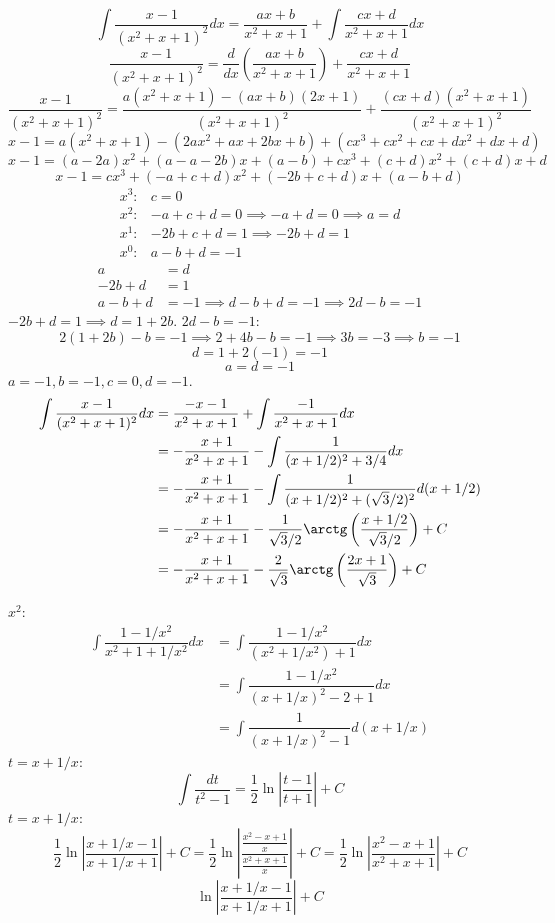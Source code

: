 \documentclass{report}
\begin{document}
\sol
{}
\[
\int \dfrac{x-1}{(x^2+x+1)^2} dx = \dfrac{ax+b}{x^2+x+1} + \int \dfrac{cx+d}{x^2+x+1} dx
\]
\[
\dfrac{x-1}{(x^2+x+1)^2} = \dfrac{d}{dx}\left( \dfrac{ax+b}{x^2+x+1} \right) + \dfrac{cx+d}{x^2+x+1}
\]
\[
\dfrac{x-1}{(x^2+x+1)^2} = \dfrac{a(x^2+x+1) - (ax+b)(2x+1)}{(x^2+x+1)^2} + \dfrac{(cx+d)(x^2+x+1)}{(x^2+x+1)^2}
\]
\[
x-1 = a(x^2+x+1) - (2ax^2+ax+2bx+b) + (cx^3+cx^2+cx+dx^2+dx+d)
\]
\[
x-1 = (a-2a)x^2+(a-a-2b)x+(a-b) + cx^3+(c+d)x^2+(c+d)x+d
\]
\[
x-1 = cx^3 + (-a+c+d)x^2 + (-2b+c+d)x + (a-b+d)
\]
\begin{align*}
x^3:& c = 0 \\
x^2:& -a+c+d = 0 \implies -a+d = 0 \implies a=d \\
x^1:& -2b+c+d = 1 \implies -2b+d = 1 \\
x^0:& a-b+d = -1
\end{align*}
\begin{align*}
a&=d \\
-2b+d&=1 \\
a-b+d&=-1 \implies d-b+d=-1 \implies 2d-b=-1
\end{align*}
 $-2b+d=1 \implies d = 1+2b$.  $2d-b=-1$:
\[
2(1+2b) - b = -1 \implies 2+4b-b = -1 \implies 3b = -3 \implies b = -1
\]
\[
d = 1+2(-1) = -1
\]
\[
a = d = -1
\]
 $a=-1, b=-1, c=0, d=-1$.
\begin{align*}
\int \dfrac{x-1}{(x^2+x+1)^2} dx &= \dfrac{-x-1}{x^2+x+1} + \int \dfrac{-1}{x^2+x+1} dx \\
&= -\dfrac{x+1}{x^2+x+1} - \int \dfrac{1}{(x+1/2)^2 + 3/4} dx \\
&= -\dfrac{x+1}{x^2+x+1} - \int \dfrac{1}{(x+1/2)^2 + (\sqrt{3}/2)^2} d(x+1/2) \\
&= -\dfrac{x+1}{x^2+x+1} - \dfrac{1}{\sqrt{3}/2} \arctg \left( \dfrac{x+1/2}{\sqrt{3}/2} \right) + C \\
&= -\dfrac{x+1}{x^2+x+1} - \dfrac{2}{\sqrt{3}} \arctg \left( \dfrac{2x+1}{\sqrt{3}} \right) + C
\end{align*}

\sol
{} $x^2$:
\begin{align*}
\int \dfrac{1 - 1/x^2}{x^2 + 1 + 1/x^2} dx &= \int \dfrac{1 - 1/x^2}{(x^2 + 1/x^2) + 1} dx \\
&= \int \dfrac{1 - 1/x^2}{(x+1/x)^2 - 2 + 1} dx \\
&= \int \dfrac{1}{(x+1/x)^2 - 1} d(x+1/x)
\end{align*}
 $t = x+1/x$:
\[
\int \dfrac{dt}{t^2-1} = \dfrac{1}{2} \ln \left| \dfrac{t-1}{t+1} \right| + C
\]
 $t = x+1/x$:
\[
\dfrac{1}{2} \ln \left| \dfrac{x+1/x - 1}{x+1/x + 1} \right| + C = \dfrac{1}{2} \ln \left| \dfrac{\frac{x^2-x+1}{x}}{\frac{x^2+x+1}{x}} \right| + C = \dfrac{1}{2} \ln \left| \dfrac{x^2-x+1}{x^2+x+1} \right| + C
\]
\[
\ln \left| \dfrac{x+1/x - 1}{x+1/x + 1} \right| + C
\]
\end{document}
